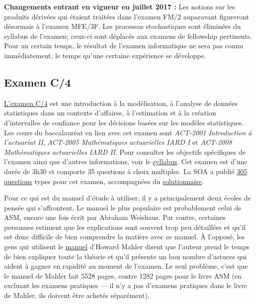 \documentclass[11pt,french]{article}
\begin{document}
\textbf{Changements entrant en vigueur en juillet 2017 :} Les notions sur les produits dérivées qui étaient traitées dans l'examen FM/2 auparavant figureront désormais à l'examen MFE/3F. Les processus stochastiques sont éliminées du syllabus de l'examen; ceux-ci sont déplacés aux examens de fellowship pertinents. Pour un certain temps, le résultat de l’examen informatique ne sera pas connu immédiatement, le temps qu’une certaine expérience se développe.

\newpage
\subsection*{Examen C/4}
\label{subsec:examc}
\href{https://www.soa.org/education/exam-req/edu-exam-c-detail.aspx}{L'examen C/4} est une introduction à la modélisation, à l'analyse de données statistiques dans un contexte d'affaires, à l'estimation et à la création d'intervalles de confiance pour les décisions basées sur les modèles statistiques. Les cours du baccalauréat en lien avec cet examen sont \textit{ACT-2001 Introduction à l'actuariat II}, \textit{ACT-2005 Mathématiques actuarielles IARD I} et \textit{ACT-2008 Mathématiques actuarielles IARD II}. Pour consulter les objectifs spécifiques de l'examen ainsi que d'autres informations, voir le \href{https://www.soa.org/Files/Edu/2017/edu-2017-02-exam-c-syllabus.pdf}{syllabus}. Cet examen est d'une durée de 3h30 et comporte 35 questions à choix multiples. La SOA a publié \href{http://www.soa.org/files/edu/edu-exam-c-sample-quest.pdf}{305 questions} types pour cet examen, accompagnées du \href{http://www.soa.org/files/edu/edu-exam-c-sample-sol.pdf}{solutionnaire}.\vspace{\baselineskip}

Pour ce qui est du manuel d'étude à utiliser, il y a principalement deux écoles de pensée qui s'affrontent. Le manuel le plus populaire est probablement celui de ASM, encore une fois écrit par Abraham Weishaus. Par contre, certaines personnes estiment que les explications sont souvent trop peu détaillées et qu'il est donc difficile de bien comprendre la matière avec ce manuel. À l'opposé, les gens qui utilisent le \href{http://howardmahler.com/Teaching/C.html}{manuel} d'Howard Mahler disent que l'auteur prend le temps de bien expliquer toute la théorie et qu'il présente un bon nombre d'astuces qui aident à gagner en rapidité au moment de l'examen. Le seul problème, c'est que le manuel de Mahler fait 5528 pages, contre 1282 pages pour le livre ASM (en excluant les examens pratiques --- il n'y a pas d'examens pratiques dans le livre de Mahler, ils doivent être achetés séparément). \vspace{\baselineskip}
\end{document}
